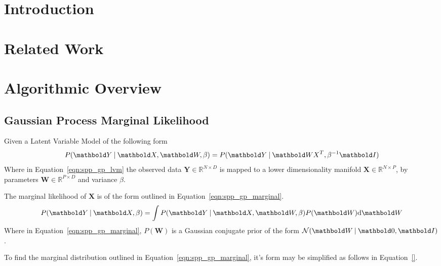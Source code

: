 \section{Introduction}
\label{sec:spp_introduction}
% 

\section{Related Work}
\label{sec:spp_related}

\section{Algorithmic Overview}
\label{sec:spp_algorithm}
\subsection{Gaussian Process Marginal Likelihood}
\label{subsec:spp_gp_marginal_likelihood}
Given a Latent Variable Model of the following form
\begin{equation}
  \label{eqn:spp_gp_lvm}
  P(\bm{Y} \given \bm{X}, \bm{W}, \beta) = P(\bm{Y} \given \bm{WX}^{T}, \beta^{-1}\bm{I})
\end{equation}
Where in Equation~\ref{eqn:spp_gp_lvm} the observed data $\bm{Y} \in \mathbb{R}^{N \times D}$ 
is mapped to a lower dimensionality manifold $\bm{X} \in \mathbb{R}^{N \times P}$, by parameters 
$\bm{W} \in \mathbb{R}^{P \times D}$ and variance $\beta$.

The marginal likelihood of $\bm{X}$ is of the form outlined in Equation~\ref{eqn:spp_gp_marginal}.
\begin{equation}
  \label{eqn:spp_gp_marginal}
  P(\bm{Y} \given \bm{X}, \beta) = \int P(\bm{Y} \given \bm{X}, \bm{W}, \beta) P(\bm{W}) \intd{\bm{W}}
\end{equation}
Where in Equation~\ref{eqn:spp_gp_marginal}, $P(\bm{W})$ is a Gaussian conjugate prior of the 
form $\mathcal{N}(\bm{W} \given \bm{0}, \bm{I})$.

To find the marginal distribution outlined in Equation~\ref{eqn:spp_gp_marginal}, it's form may 
be simplified as follows in Equation~\ref{}.


